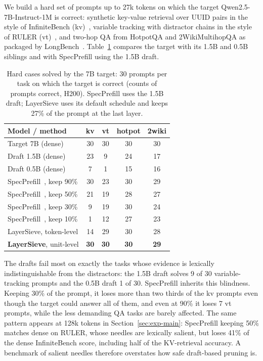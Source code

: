 \documentclass[10pt,conference]{IEEEtran}
\begin{document}
We build a hard set of prompts up to 27k tokens on which the target Qwen2.5-7B-Instruct-1M is correct: synthetic key-value retrieval over UUID pairs in the style of InfiniteBench (kv)~\cite{zhang_etal_2024_bench}, variable tracking with distractor chains in the style of RULER (vt)~\cite{ruler2024}, and two-hop QA from HotpotQA and 2WikiMultihopQA as packaged by LongBench~\cite{yang2018hotpotqa,ho2020constructing,bai2024longbench}. Table~\ref{tab:draft} compares the target with its 1.5B and 0.5B siblings and with SpecPrefill using the 1.5B draft.

\begin{table}[t]
\centering
\caption{Hard cases solved by the 7B target: 30 prompts per task on which the target is correct (counts of prompts correct, H200). SpecPrefill uses the 1.5B draft; LayerSieve uses its default schedule and keeps 27\% of the prompt at the last layer.}
\label{tab:draft}
\setlength{\tabcolsep}{4pt}
\small
\begin{tabular}{lcccc}
\toprule
Model / method & kv & vt & hotpot & 2wiki \\
\midrule
Target 7B (dense) & 30 & 30 & 30 & 30 \\
Draft 1.5B (dense) & 23 & 9 & 24 & 17 \\
Draft 0.5B (dense) & 7 & 1 & 15 & 16 \\
\midrule
SpecPrefill~\cite{liu2025specprefill}, keep 90\% & 30 & 23 & 30 & 29 \\
SpecPrefill~\cite{liu2025specprefill}, keep 50\% & 21 & 19 & 28 & 27 \\
SpecPrefill~\cite{liu2025specprefill}, keep 30\% & 9 & 19 & 30 & 24 \\
SpecPrefill~\cite{liu2025specprefill}, keep 10\% & 1 & 12 & 27 & 23 \\
LayerSieve, token-level & 14 & 29 & 30 & 28 \\
\textbf{LayerSieve}, unit-level & \textbf{30} & \textbf{30} & \textbf{30} & \textbf{29} \\
\bottomrule
\end{tabular}
\end{table}

The drafts fail most on exactly the tasks whose evidence is lexically indistinguishable from the distractors: the 1.5B draft solves 9 of 30 variable-tracking prompts and the 0.5B draft 1 of 30. SpecPrefill inherits this blindness. Keeping 30\% of the prompt, it loses more than two thirds of the kv prompts even though the target could answer all of them, and even at 90\% it loses 7 vt prompts, while the less demanding QA tasks are barely affected. The same pattern appears at 128k tokens in Section~\ref{sec:exp-main}: SpecPrefill keeping 50\% matches dense on RULER, whose needles are lexically salient, but loses 41\% of the dense InfiniteBench score, including half of the KV-retrieval accuracy. A benchmark of salient needles therefore overstates how safe draft-based pruning is.
\end{document}
